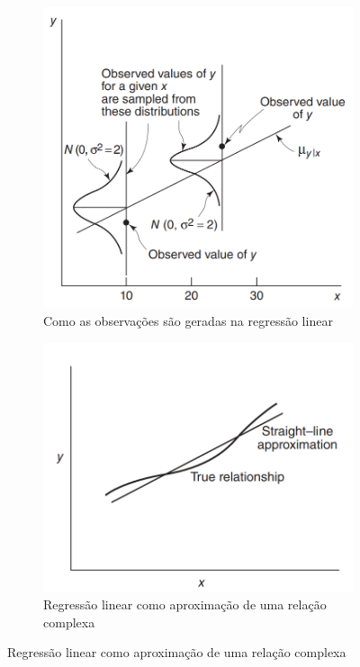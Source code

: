 \begin{figure}[H]
	\centering
	\caption{Interpretação de uma regressão linear}
	\begin{subfigure}{0.4\textwidth}
	  \includegraphics[width=\linewidth]{figuras/how_observations_are_generated_in_linear_regression.png}
	  \caption{Como as observações são geradas na regressão linear}
	  \label{fig:observacoes_regressao_linear}
	\end{subfigure}
	\hspace{0.5cm}
	\begin{subfigure}{0.4\textwidth} 
		\includegraphics[width=\linewidth]{figuras/linear_regression_approximation_of_a_complex_relationship.png}
		\caption{Regressão linear como aproximação de uma relação complexa}
		\label{fig:regressao_linear_aprox_relacao_complexa}
	\end{subfigure}
	\label{fig:comportamento_regressao_linear}
\end{figure}

